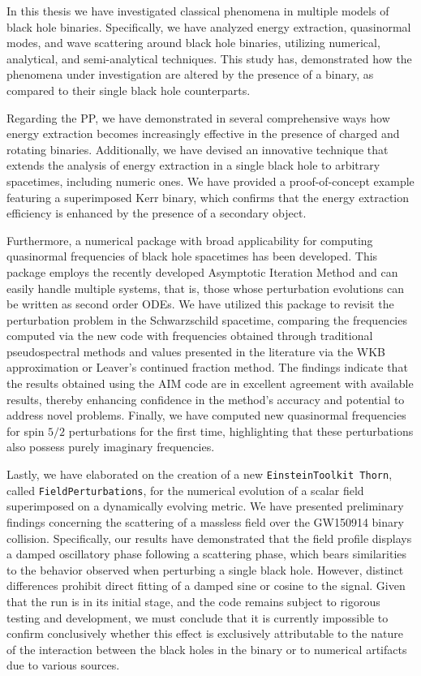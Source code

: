 In this thesis we have investigated classical phenomena in multiple models of black hole binaries. Specifically, we have analyzed energy extraction, quasinormal modes, and wave scattering around black hole binaries, utilizing numerical, analytical, and semi-analytical techniques. This study has, demonstrated how the phenomena under investigation are altered by the presence of a binary, as compared to their single black hole counterparts.

Regarding the \ac{PP}, we have demonstrated in several comprehensive ways how energy extraction becomes increasingly effective in the presence of charged and rotating binaries. Additionally, we have devised an innovative technique that extends the analysis of energy extraction in a single black hole to arbitrary spacetimes, including numeric ones. We have provided a proof-of-concept example featuring a superimposed Kerr binary, which confirms that the energy extraction efficiency is enhanced by the presence of a secondary object.

Furthermore, a numerical package with broad applicability for computing quasinormal frequencies of black hole spacetimes has been developed. This package employs the recently developed Asymptotic Iteration Method and can easily handle multiple systems, that is, those whose perturbation evolutions can be written as second order ODEs. We have utilized this package to revisit the perturbation problem in the Schwarzschild spacetime, comparing the frequencies computed via the new code with frequencies obtained through traditional pseudospectral methods and values presented in the literature via the WKB approximation or Leaver's continued fraction method. The findings indicate that the results obtained using the \ac{AIM} code are in excellent agreement with available results, thereby enhancing confidence in the method's accuracy and potential to address novel problems. Finally, we have computed new quasinormal frequencies for spin $5/2$ perturbations for the first time, highlighting that these perturbations also possess purely imaginary frequencies.

Lastly, we have elaborated on the creation of a new \texttt{EinsteinToolkit Thorn}, called \texttt{FieldPerturbations}, for the numerical evolution of a scalar field superimposed on a dynamically evolving metric. We have presented preliminary findings concerning the scattering of a massless field over the GW150914 binary collision. Specifically, our results have demonstrated that the field profile displays a damped oscillatory phase following a scattering phase, which bears similarities to the behavior observed when perturbing a single black hole. However, distinct differences prohibit direct fitting of a damped sine or cosine to the signal. Given that the run is in its initial stage, and the code remains subject to rigorous testing and development, we must conclude that it is currently impossible to confirm conclusively whether this effect is exclusively attributable to the nature of the interaction between the black holes in the binary or to numerical artifacts due to various sources.


